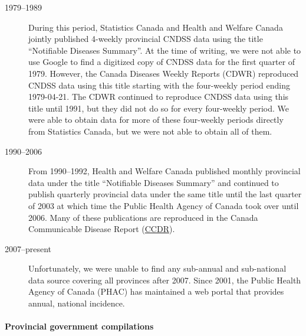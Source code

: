 \documentclass[12pt]{article}
\begin{document}
\begin{description}
\item[1979--1989] During this period, Statistics Canada and Health and Welfare Canada jointly published 4-weekly provincial CNDSS data using the title ``Notifiable Diseases Summary''.  At the time of writing, we were not able to use Google to find a digitized copy of CNDSS data for the first quarter of 1979. However, the Canada Diseases Weekly Reports (CDWR) reproduced CNDSS data using this title starting with the four-weekly period ending 1979-04-21. The CDWR continued to reproduce CNDSS data using this title until 1991, but they did not do so for every four-weekly period.  We were able to obtain data for more of these four-weekly periods directly from Statistics Canada, but we were not able to obtain all of them.
\item[1990--2006] From 1990--1992, Health and Welfare Canada published monthly provincial data under the title ``Notifiable Diseases Summary'' and continued to publish quarterly provincial data under the same title until the last quarter of 2003 at which time the Public Health Agency of Canada took over until 2006. Many of these publications are reproduced in the Canada Communicable Disease Report (\href{https://www.canada.ca/en/public-health/services/reports-publications/canada-communicable-disease-report-ccdr.html}{CCDR}).
\item[2007--present] Unfortunately, we were unable to find any sub-annual and sub-national data source covering all provinces after 2007. Since 2001, the Public Health Agency of Canada (PHAC) has maintained a web portal \cite{totten2019updates} that provides annual, national incidence.
\end{description}

\paragraph*{Provincial government compilations}
\end{document}

